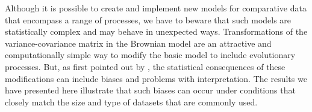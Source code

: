 \documentclass[a4paper,12pt]{article}
\begin{document}

Although it is possible to create and implement new models for comparative data that encompass a range of processes, we have to beware that such models are statistically complex and may behave in unexpected ways. Transformations of the variance-covariance matrix in the Brownian model are an attractive and computationally simple way to modify the basic model to include evolutionary processes. But, as first pointed out by \citet{grafen1989phylogenetic}, the statistical consequences of these modifications can include biases and problems with interpretation. The results we have presented here illustrate that such biases can occur under conditions that closely match the size and type of datasets that are commonly used. 
\end{document}
